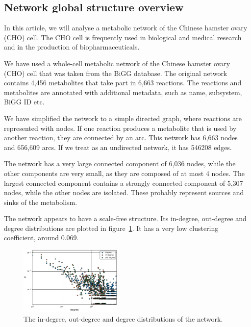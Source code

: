 \subsection{Network global structure overview}
\label{sec:overview}

In this article, we will analyse a metabolic network of the Chinese hamster
ovary (CHO) cell. The CHO cell is frequently used in biological and medical
research and in the production of biopharmaceuticals\cite{chocons}.

We have used a whole-cell metabolic network of the Chinese hamster ovary (CHO)
cell that was taken from the BiGG database\cite{bigg,chocons}. The original
network contains 4,456 metabolites that take part in 6,663 reactions. The
reactions and metabolites are annotated with additional metadata, such as name,
subsystem, BiGG ID etc.

We have simplified the network to a simple directed graph, where reactions are
represented with nodes. If one reaction produces a metabolite that is used by
another reaction, they are connected by an arc. This network has 6,663 nodes and
656,609 arcs. If we treat as an undirected network, it has 546208 edges.

The network has a very large connected component of 6,036 nodes, while the other
components are very small, as they are composed of at most 4 nodes. The largest
connected component contains a strongly connected component of 5,307 nodes,
while the other nodes are isolated. These probably represent sources and sinks
of the metabolism.

The network appears to have a scale-free structure. Its in-degree, out-degree and degree
distributions are plotted in figure~\ref{fig:dist}. It has a very low clustering
coefficient, around 0.069.

\begin{figure}
  \includegraphics[width=0.45\textwidth]{../plots/degree}
  \caption{The in-degree, out-degree and degree distributions of the network.}
  \label{fig:dist}
\end{figure}


